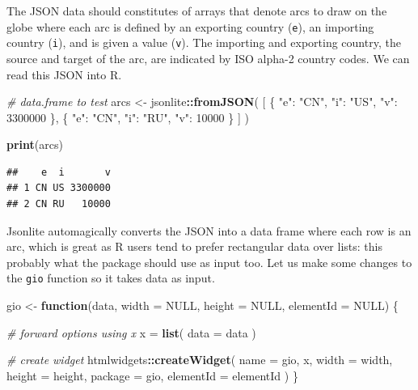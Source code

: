 \documentclass[
]{krantz}
\makeatletter
\newenvironment{Shaded}{\begin{snugshade}}{\end{snugshade}}
\newcommand{\CommentTok}[1]{\textcolor[rgb]{0.37,0.37,0.37}{\textit{#1}}}
\newcommand{\ControlFlowTok}[1]{\textcolor[rgb]{0.27,0.27,0.27}{\textbf{#1}}}
\newcommand{\DataTypeTok}[1]{\textcolor[rgb]{0.27,0.27,0.27}{#1}}
\newcommand{\KeywordTok}[1]{\textcolor[rgb]{0.27,0.27,0.27}{\textbf{#1}}}
\newcommand{\NormalTok}[1]{#1}
\newcommand{\OperatorTok}[1]{\textcolor[rgb]{0.43,0.43,0.43}{\textbf{#1}}}
\newcommand{\OtherTok}[1]{\textcolor[rgb]{0.37,0.37,0.37}{#1}}
\newcommand{\StringTok}[1]{\textcolor[rgb]{0.5,0.5,0.5}{#1}}
\newenvironment{kframe}{%
\medskip{}
\setlength{\fboxsep}{.8em}
 \def\at@end@of@kframe{}%
 \ifinner\ifhmode%
  \def\at@end@of@kframe{\end{minipage}}%
  \begin{minipage}{\columnwidth}%
 \fi\fi%
 \def\FrameCommand##1{\hskip\@totalleftmargin \hskip-\fboxsep
 \colorbox{shadecolor}{##1}\hskip-\fboxsep
     \hskip-\linewidth \hskip-\@totalleftmargin \hskip\columnwidth}%
 \MakeFramed {\advance\hsize-\width
   \@totalleftmargin\z@ \linewidth\hsize
   \@setminipage}}%
 {\par\unskip\endMakeFramed%
 \at@end@of@kframe}
\renewenvironment{Shaded}{\begin{kframe}}{\end{kframe}}
\makeatother
\begin{document}
The JSON data should constitutes of arrays that denote arcs to draw on the globe where each arc is defined by an exporting country (\texttt{e}), an importing country (\texttt{i}), and is given a value (\texttt{v}). The importing and exporting country, the source and target of the arc, are indicated by ISO alpha-2 country codes. We can read this JSON into R.

\begin{Shaded}
\begin{Highlighting}[]
\CommentTok{\# data.frame to test}
\NormalTok{arcs <{-}}\StringTok{ }\NormalTok{jsonlite}\OperatorTok{::}\KeywordTok{fromJSON}\NormalTok{(}
  \StringTok{\textquotesingle{}[}
\StringTok{    \{}
\StringTok{      "e": "CN",}
\StringTok{      "i": "US",}
\StringTok{      "v": 3300000}
\StringTok{    \},}
\StringTok{    \{}
\StringTok{      "e": "CN",}
\StringTok{      "i": "RU",}
\StringTok{      "v": 10000}
\StringTok{    \}}
\StringTok{  ]\textquotesingle{}}
\NormalTok{)}

\KeywordTok{print}\NormalTok{(arcs)}
\end{Highlighting}
\end{Shaded}

\begin{verbatim}
##    e  i       v
## 1 CN US 3300000
## 2 CN RU   10000
\end{verbatim}

Jsonlite automagically converts the JSON into a data frame where each row is an arc, which is great as R users tend to prefer rectangular data over lists: this probably what the package should use as input too. Let us make some changes to the \texttt{gio} function so it takes data as input.

\begin{Shaded}
\begin{Highlighting}[]
\NormalTok{gio <{-}}\StringTok{ }\ControlFlowTok{function}\NormalTok{(data, }\DataTypeTok{width =} \OtherTok{NULL}\NormalTok{, }\DataTypeTok{height =} \OtherTok{NULL}\NormalTok{, }\DataTypeTok{elementId =} \OtherTok{NULL}\NormalTok{) \{}

  \CommentTok{\# forward options using x}
\NormalTok{  x =}\StringTok{ }\KeywordTok{list}\NormalTok{(}
    \DataTypeTok{data =}\NormalTok{ data}
\NormalTok{  )}

  \CommentTok{\# create widget}
\NormalTok{  htmlwidgets}\OperatorTok{::}\KeywordTok{createWidget}\NormalTok{(}
    \DataTypeTok{name =} \StringTok{\textquotesingle{}gio\textquotesingle{}}\NormalTok{,}
\NormalTok{    x,}
    \DataTypeTok{width =}\NormalTok{ width,}
    \DataTypeTok{height =}\NormalTok{ height,}
    \DataTypeTok{package =} \StringTok{\textquotesingle{}gio\textquotesingle{}}\NormalTok{,}
    \DataTypeTok{elementId =}\NormalTok{ elementId}
\NormalTok{  )}
\NormalTok{\}}
\end{Highlighting}
\end{Shaded}
\end{document}

